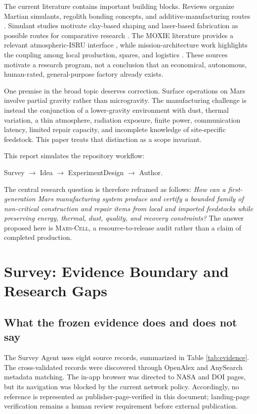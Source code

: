 \documentclass[conference]{../../../../Conference-LaTeX-template_10-17-19/IEEEtran}
\newcommand{\marscell}{\textsc{Mars-Cell}}
\begin{document}
The current literature contains important building blocks. Reviews organize Martian simulants, regolith bonding concepts, and additive-manufacturing routes \cite{karl_cannon_gurlo_2021,wang_etal_2022}. Simulant studies motivate clay-based shaping and laser-based fabrication as possible routes for comparative research \cite{karl_etal_2020,balla_etal_2012}. The MOXIE literature provides a relevant atmospheric-ISRU interface \cite{hecht_etal_2020}, while mission-architecture work highlights the coupling among local production, spares, and logistics \cite{do_etal_2016,moses_bushnell_2016}. These sources motivate a research program, not a conclusion that an economical, autonomous, human-rated, general-purpose factory already exists.

One premise in the broad topic deserves correction. Surface operations on Mars involve partial gravity rather than microgravity. The manufacturing challenge is instead the conjunction of a lower-gravity environment with dust, thermal variation, a thin atmosphere, radiation exposure, finite power, communication latency, limited repair capacity, and incomplete knowledge of site-specific feedstock. This paper treats that distinction as a scope invariant.

This report simulates the repository workflow:
\begin{center}
Survey $\rightarrow$ Idea $\rightarrow$ ExperimentDesign $\rightarrow$ Author.
\end{center}
The central research question is therefore reframed as follows: \emph{How can a first-generation Mars manufacturing system produce and certify a bounded family of non-critical construction and repair items from local and imported feedstocks while preserving energy, thermal, dust, quality, and recovery constraints?} The answer proposed here is \marscell{}, a resource-to-release audit rather than a claim of completed production.

\section{Survey: Evidence Boundary and Research Gaps}
\subsection{What the frozen evidence does and does not say}
The Survey Agent uses eight source records, summarized in Table \ref{tab:evidence}. The cross-validated records were discovered through OpenAlex and AnySearch metadata matching. The in-app browser was directed to NASA and DOI pages, but its navigation was blocked by the current network policy. Accordingly, no reference is represented as publisher-page-verified in this document; landing-page verification remains a human review requirement before external publication.
\end{document}
